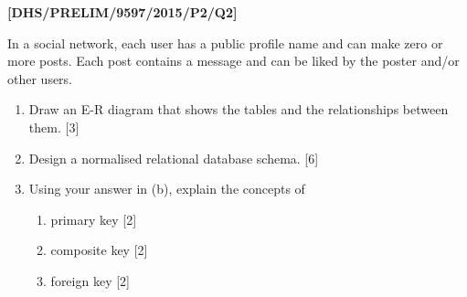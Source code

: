 \item \textbf{{[}DHS/PRELIM/9597/2015/P2/Q2{]} }

In a social network, each user has a public profile name and can make
zero or more posts. Each post contains a message and can be liked
by the poster and/or other users. 
\begin{enumerate}
\item Draw an E-R diagram that shows the tables and the relationships between
them. \hfill{}{[}3{]}
\item Design a normalised relational database schema. \hfill{}{[}6{]}
\item Using your answer in (b), explain the concepts of 
\begin{enumerate}
\item primary key \hfill{} {[}2{]}
\item composite key \hfill{}{[}2{]}
\item foreign key \hfill{} {[}2{]}
\end{enumerate}
\end{enumerate}